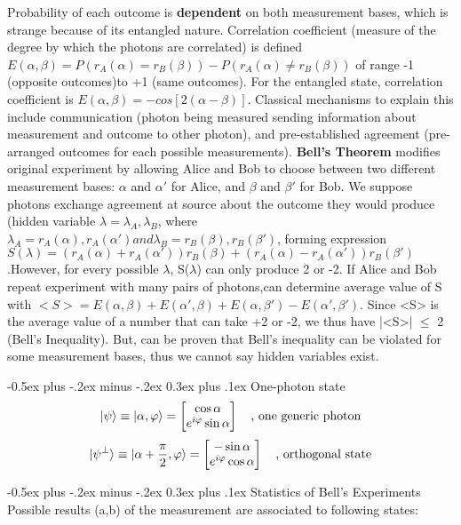 \documentclass[a4paper,11pt,portrait]{article}
\makeatletter
\renewcommand{\subsection}{\@startsection{subsection}{2}{0mm}%
                                {-0.5ex plus -.2ex minus -.2ex}%
                                {0.3ex plus .1ex}%
                                {\normalfont\footnotesize\bfseries}}
\makeatother
\begin{document}
\begin{multicols}{3}
Probability of each outcome is \textbf{dependent} on both measurement bases, which is strange because of its entangled nature. Correlation coefficient (measure of the degree by which the photons are correlated) is defined $E(\alpha, \beta) = P(r_A(\alpha) = r_B(\beta)) - P(r_A(\alpha) \neq r_B(\beta))$ of range -1 (opposite outcomes)to +1 (same outcomes). For the entangled state, correlation coefficient is $E(\alpha, \beta) = -cos[2(\alpha - \beta)]$. Classical mechanisms to explain this include communication (photon being measured sending information about measurement and outcome to other photon), and pre-established agreement (pre-arranged outcomes for each possible measurements). \textbf{Bell's Theorem} modifies original experiment by allowing Alice and Bob to choose between two different measurement bases: $\alpha$ and $\alpha'$ for Alice, and $\beta$ and $\beta'$ for Bob. We suppose photons exchange agreement at source about the outcome they would produce (hidden variable $\lambda = {\lambda_A, \lambda_B}$, where $\lambda_A = {r_A(\alpha),r_A(\alpha')} and \lambda_B = {r_B(\beta), r_B(\beta')}$, forming expression $S(\lambda) = (r_A(\alpha) + r_A(\alpha'))r_B(\beta) + (r_A(\alpha) - r_A(\alpha'))r_B(\beta')$.However, for every possible $\lambda$, S($\lambda$) can only produce 2 or -2. If Alice and Bob repeat experiment with many pairs of photons,can determine average value of S with $<S> = E(\alpha,\beta) + E(\alpha',\beta) + E(\alpha, \beta') - E(\alpha',\beta')$. Since <S> is the average value of a number that can take +2 or -2, we thus have |<S>| $\leq$ 2 (Bell's Inequality). But, can be proven that Bell's inequality can be violated for some measurement bases, thus we cannot say hidden variables exist.

\subsection{One-photon state}
$$\ket{\psi}\equiv\ket{\alpha,\varphi}=\begin{bmatrix}
    \cos{\alpha} \\
     e^{i\varphi}\sin{\alpha}
\end{bmatrix} \quad \text{, one generic photon} $$
$$\ket{\psi^{\perp}}\equiv\ket{\alpha + \frac{\pi}{2},\varphi}=\begin{bmatrix}
    -\sin{\alpha} \\
     e^{i\varphi}\cos{\alpha}
\end{bmatrix} \quad \text{, orthogonal state} $$


\subsection{Statistics of Bell's Experiments}
Possible results (a,b) of the measurement are associated to following states:


\end{multicols}
\end{document}
